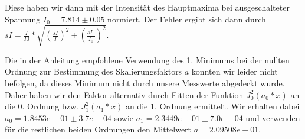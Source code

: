 Diese haben wir dann mit der Intensität des Hauptmaxima bei ausgeschalteter Spannung $I_0 = 7.814 \pm 0.05$ normiert. Der Fehler ergibt sich dann durch $sI = \frac{I}{I0} * \sqrt{\left(\frac{sI}{I}\right)^2 + \left(\frac{sI_0}{I_0}\right)^2}$.

Die in der Anleitung empfohlene Verwendung des 1. Minimums bei der nullten Ordnung zur Bestimmung des Skalierungsfaktors $ a $ konnten wir leider nicht befolgen, da dieses Minimum nicht durch unsere Messwerte abgedeckt wurde. Daher haben wir den Faktor alternativ durch Fitten der Funktion $J_0^2(a_0*x)$ an die 0. Ordnung bzw. $J_1^2(a_1*x)$ an die 1. Ordnung ermittelt. Wir erhalten dabei $a_0 = 1.8453e-01 \pm 3.7e-04$ sowie $a_1 = 2.3449e-01 \pm 7.0e-04 $ und verwenden für die restlichen beiden Ordnungen den Mittelwert $a = 2.09508e-01$. 

